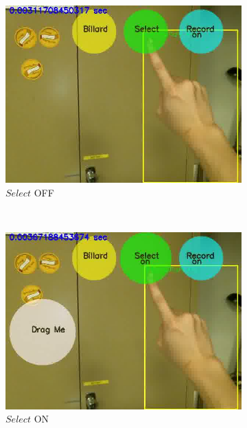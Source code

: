 \begin{figure}
    \centering
    \begin{subfigure}[b]{0.5\columnwidth}
        \centering
        \includegraphics[width=\columnwidth]{ch5/figs/28}
        \caption{$Select$ OFF}\label{select_off}
    \end{subfigure}~\begin{subfigure}[b]{0.5\columnwidth}
        \centering
        \includegraphics[width=\columnwidth]{ch5/figs/29}
        \caption{$Select$ ON}\label{select_on}
    \end{subfigure}
    \\
    \vspace{10pt}
    \begin{subfigure}[b]{0.5\columnwidth}

\end{subfigure}
\end{figure}
